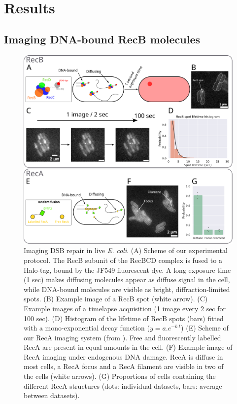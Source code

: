 \section*{Results}

\subsection*{Imaging DNA-bound RecB molecules}

\begin{figure}[htbp]
    \centering
    \includegraphics[width=\textwidth]{Figures/Fig1_endogenous.pdf}
    \caption{Imaging DSB repair in live \textit{E. coli}. (A) Scheme of our experimental protocol. The RecB subunit of the RecBCD complex is fused to a Halo-tag, bound by the JF549 fluorescent dye. A long exposure time (1 sec) makes diffusing molecules appear as diffuse signal in the cell, while DNA-bound molecules are visible as bright, diffraction-limited spots. (B) Example image of a RecB spot (white arrow). (C) Example images of a timelapse acquisition (1 image every 2 sec for 100 sec). (D) Histogram of the lifetime of RecB spots (bars) fitted with a mono-exponential decay function ($y=a.e^{-k.t}$) (E) Scheme of our RecA imaging system (from \cite{Wiktor2021}). Free and fluorescently labelled RecA are present in equal amounts in the cell. (F) Example image of RecA imaging under endogenous DNA damage. RecA is diffuse in most cells, a RecA focus and a RecA filament are visible in two of the cells (white arrows). (G) Proportions of cells containing the different RecA structures (dots: individual datasets, bars: average between datasets).}
    \label{Fig:endogenous}
\end{figure}

